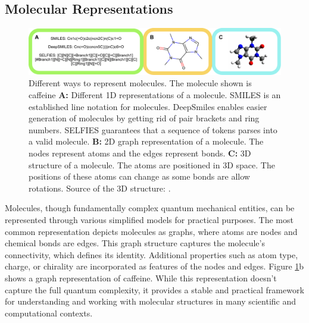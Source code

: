 \subsection{Molecular Representations}
\begin{figure}
      \centering
      \includegraphics[width=\textwidth]{figures/representations/representations.pdf}
      \caption{Different ways to represent molecules. The molecule shown is caffeine \textbf{A:}
            Different 1D representations of a molecule. SMILES is an established line notation for
            molecules. DeepSmiles enables easier generation of molecules by getting rid of pair
            brackets and ring numbers. SELFIES guarantees that a sequence of tokens parses into a
            valid molecule. \textbf{B:} 2D graph representation of a molecule. The nodes represent
            atoms and the edges represent bonds. \textbf{C:} 3D structure of a molecule. The atoms
            are positioned in 3D space. The positions of these atoms can change as some bonds are
            allow rotations. Source of the 3D structure:
            \citep{EnglishCaffeine3D2010}.\label{fig:molecular-graph}}
\end{figure}
Molecules, though fundamentally complex quantum mechanical entities, can be represented through
various simplified models for practical purposes. The most common representation depicts molecules
as graphs, where atoms are nodes and chemical bonds are edges. This graph structure captures the
molecule's connectivity, which defines its identity. Additional properties such as atom type,
charge, or chirality are incorporated as features of the nodes and edges.
Figure \ref{fig:molecular-graph}b shows a graph representation of caffeine. While this representation
doesn't capture the full quantum complexity, it provides a stable and practical framework for
understanding and working with molecular structures in many scientific and computational contexts.

